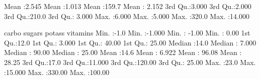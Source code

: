 \documentclass[
  11pt,
]{book}
\makeatletter
\newenvironment{Shaded}{}{}
\newcommand{\DecValTok}[1]{#1}
\newcommand{\FloatTok}[1]{#1}
\newcommand{\NormalTok}[1]{#1}
\newcommand{\SpecialCharTok}[1]{\textcolor[rgb]{0.39,0.39,0.39}{#1}}
\newenvironment{kframe}{%
\medskip{}
\setlength{\fboxsep}{.8em}
 \def\at@end@of@kframe{}%
 \ifinner\ifhmode%
  \def\at@end@of@kframe{\end{minipage}}%
  \begin{minipage}{\columnwidth}%
 \fi\fi%
 \def\FrameCommand##1{\hskip\@totalleftmargin \hskip-\fboxsep
 \colorbox{shadecolor}{##1}\hskip-\fboxsep
     \hskip-\linewidth \hskip-\@totalleftmargin \hskip\columnwidth}%
 \MakeFramed {\advance\hsize-\width
   \@totalleftmargin\z@ \linewidth\hsize
   \@setminipage}}%
 {\par\unskip\endMakeFramed%
 \at@end@of@kframe}
\renewenvironment{Shaded}{\begin{kframe}}{\end{kframe}}
\theoremstyle{definition}
\theoremstyle{definition}
\theoremstyle{definition}
\theoremstyle{definition}
\theoremstyle{remark}
\makeatother
\begin{document}
\begin{Shaded}
\begin{Highlighting}[]
\NormalTok{    Mean   }\SpecialCharTok{:}\FloatTok{2.545}\NormalTok{   Mean   }\SpecialCharTok{:}\FloatTok{1.013}\NormalTok{   Mean   }\SpecialCharTok{:}\FloatTok{159.7}\NormalTok{   Mean   }\SpecialCharTok{:} \FloatTok{2.152}  
    \DecValTok{3}\NormalTok{rd Qu.}\SpecialCharTok{:}\FloatTok{3.000}   \DecValTok{3}\NormalTok{rd Qu.}\SpecialCharTok{:}\FloatTok{2.000}   \DecValTok{3}\NormalTok{rd Qu.}\SpecialCharTok{:}\FloatTok{210.0}   \DecValTok{3}\NormalTok{rd Qu.}\SpecialCharTok{:} \FloatTok{3.000}  
\NormalTok{    Max.   }\SpecialCharTok{:}\FloatTok{6.000}\NormalTok{   Max.   }\SpecialCharTok{:}\FloatTok{5.000}\NormalTok{   Max.   }\SpecialCharTok{:}\FloatTok{320.0}\NormalTok{   Max.   }\SpecialCharTok{:}\FloatTok{14.000}  
                                                                    
\NormalTok{        carbo          sugars           potass          vitamins     }
\NormalTok{    Min.   }\SpecialCharTok{:{-}}\FloatTok{1.0}\NormalTok{   Min.   }\SpecialCharTok{:{-}}\FloatTok{1.000}\NormalTok{   Min.   }\SpecialCharTok{:} \SpecialCharTok{{-}}\FloatTok{1.00}\NormalTok{   Min.   }\SpecialCharTok{:}  \FloatTok{0.00}  
    \DecValTok{1}\NormalTok{st Qu.}\SpecialCharTok{:}\FloatTok{12.0}   \DecValTok{1}\NormalTok{st Qu.}\SpecialCharTok{:} \FloatTok{3.000}   \DecValTok{1}\NormalTok{st Qu.}\SpecialCharTok{:} \FloatTok{40.00}   \DecValTok{1}\NormalTok{st Qu.}\SpecialCharTok{:} \FloatTok{25.00}  
\NormalTok{    Median }\SpecialCharTok{:}\FloatTok{14.0}\NormalTok{   Median }\SpecialCharTok{:} \FloatTok{7.000}\NormalTok{   Median }\SpecialCharTok{:} \FloatTok{90.00}\NormalTok{   Median }\SpecialCharTok{:} \FloatTok{25.00}  
\NormalTok{    Mean   }\SpecialCharTok{:}\FloatTok{14.6}\NormalTok{   Mean   }\SpecialCharTok{:} \FloatTok{6.922}\NormalTok{   Mean   }\SpecialCharTok{:} \FloatTok{96.08}\NormalTok{   Mean   }\SpecialCharTok{:} \FloatTok{28.25}  
    \DecValTok{3}\NormalTok{rd Qu.}\SpecialCharTok{:}\FloatTok{17.0}   \DecValTok{3}\NormalTok{rd Qu.}\SpecialCharTok{:}\FloatTok{11.000}   \DecValTok{3}\NormalTok{rd Qu.}\SpecialCharTok{:}\FloatTok{120.00}   \DecValTok{3}\NormalTok{rd Qu.}\SpecialCharTok{:} \FloatTok{25.00}  
\NormalTok{    Max.   }\SpecialCharTok{:}\FloatTok{23.0}\NormalTok{   Max.   }\SpecialCharTok{:}\FloatTok{15.000}\NormalTok{   Max.   }\SpecialCharTok{:}\FloatTok{330.00}\NormalTok{   Max.   }\SpecialCharTok{:}\FloatTok{100.00}  
                                                                     

\end{Highlighting}
\end{Shaded}
\end{document}
